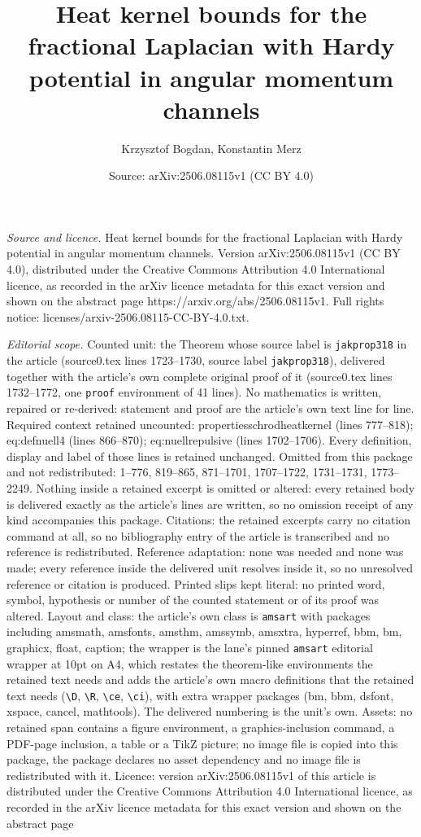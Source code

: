 \documentclass[10pt,a4paper]{amsart}
\title[Heat kernel bounds for the fractional Laplacian with Hardy p]{Heat kernel bounds for the fractional Laplacian with Hardy potential in angular momentum channels}
\author{Krzysztof Bogdan, Konstantin Merz}
\date{Source: arXiv:2506.08115v1 (CC BY 4.0)}
\begin{document}
\maketitle

\noindent\emph{Source and licence.} Heat kernel bounds for the fractional Laplacian with Hardy potential in angular momentum channels. Version arXiv:2506.08115v1 (CC BY 4.0), distributed under the Creative Commons Attribution 4.0 International licence, as recorded in the arXiv licence metadata for this exact version and shown on the abstract page https://arxiv.org/abs/2506.08115v1. Full rights notice: licenses/arxiv-2506.08115-CC-BY-4.0.txt.\par\smallskip

\noindent\textit{Editorial scope.} Counted unit: the Theorem whose source label is \texttt{jakprop318} in the article (source0.tex lines 1723--1730, source label \texttt{jakprop318}), delivered together with the article's own complete original proof of it (source0.tex lines 1732--1772, one \texttt{proof} environment of 41 lines). No mathematics is written, repaired or re-derived: statement and proof are the article's own text line for line. Required context retained uncounted: propertiesschrodheatkernel (lines 777--818); eq:defnuell4 (lines 866--870); eq:nuellrepulsive (lines 1702--1706). Every definition, display and label of those lines is retained unchanged. Omitted from this package and not redistributed: 1--776, 819--865, 871--1701, 1707--1722, 1731--1731, 1773--2249. Nothing inside a retained excerpt is omitted or altered: every retained body is delivered exactly as the article's lines are written, so no omission receipt of any kind accompanies this package. Citations: the retained excerpts carry no citation command at all, so no bibliography entry of the article is transcribed and no reference is redistributed. Reference adaptation: none was needed and none was made; every reference inside the delivered unit resolves inside it, so no unresolved reference or citation is produced. Printed slips kept literal: no printed word, symbol, hypothesis or number of the counted statement or of its proof was altered. Layout and class: the article's own class is \texttt{amsart} with packages including amsmath, amsfonts, amsthm, amssymb, amsxtra, hyperref, bbm, bm, graphicx, float, caption; the wrapper is the lane's pinned \texttt{amsart} editorial wrapper at 10pt on A4, which restates the theorem-like environments the retained text needs and adds the article's own macro definitions that the retained text needs (\texttt{\textbackslash D}, \texttt{\textbackslash R}, \texttt{\textbackslash ce}, \texttt{\textbackslash ci}), with extra wrapper packages (bm, bbm, dsfont, xspace, cancel, mathtools). The delivered numbering is the unit's own. Assets: no retained span contains a figure environment, a graphics-inclusion command, a PDF-page inclusion, a table or a TikZ picture; no image file is copied into this package, the package declares no asset dependency and no image file is redistributed with it. Licence: version arXiv:2506.08115v1 of this article is distributed under the Creative Commons Attribution 4.0 International licence, as recorded in the arXiv licence metadata for this exact version and shown on the abstract page 
\end{document}
